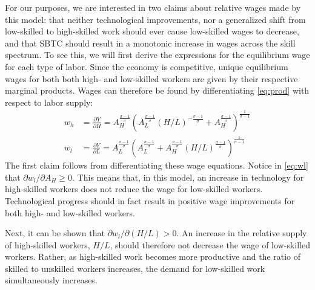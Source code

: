 For our purposes, we are interested in two claims about relative wages made by this model: that neither technological improvements, nor a generalized shift from low-skilled to high-skilled work should ever cause low-skilled wages to decrease, and that SBTC should result in a monotonic increase in wages across the skill spectrum. To see this, we will first derive the expressions for the equilibrium wage for each type of labor. Since the economy is competitive, unique equilibrium wages for both both high- and low-skilled workers are given by their respective marginal products. Wages can therefore be found by differentiating \eqref{eq:prod} with respect to labor supply:
\begin{align}
w_h &= \frac{\partial Y}{\partial H} 
     = A_H^\frac{\sigma-1}{\sigma}\left(
              A_L^{\frac{\sigma-1}{\sigma}} (H/L)^{-\frac{\sigma-1}{\sigma}} + A_H^{\frac{\sigma-1}{\sigma}}
        \right)^{\frac{1}{\sigma - 1}} \label{eq:wh} \\
w_l &= \frac{\partial Y}{\partial L} 
     = A_L^\frac{\sigma-1}{\sigma}\left(
              A_L^{\frac{\sigma-1}{\sigma}} + A_H^{\frac{\sigma-1}{\sigma}}(H/L)^{\frac{\sigma-1}{\sigma}}
        \right)^{\frac{1}{\sigma - 1}} \label{eq:wl}
\end{align}
The first claim follows from differentiating these wage equations. Notice in \eqref{eq:wl} that $\partial w_l/\partial A_H \geq 0$. This means that, in this model, an increase in technology for high-skilled workers does not reduce the wage for low-skilled workers. Technological progress should in fact result in positive wage improvements for both high- and low-skilled workers. 

Next, it can be shown that $\partial w_l/\partial(H/L)>0$. An increase in the relative supply of high-skilled workers, $H/L$, should therefore not decrease the wage of low-skilled workers. Rather, as high-skilled work becomes more productive and the ratio of skilled to unskilled workers increases, the demand for low-skilled work simultaneously increases. 

